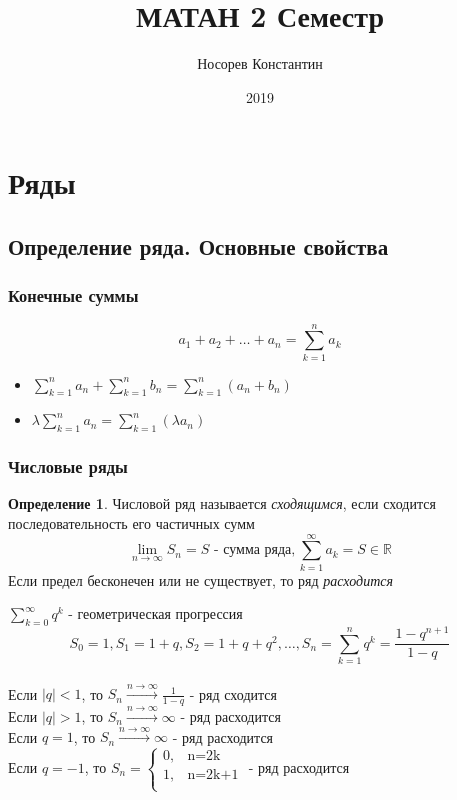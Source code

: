 \documentclass[a4paper]{article}
\title{ МАТАН 2 Семестр}
\author{Носорев Константин}
\date{2019\\}
\theoremstyle{definition}
\newtheorem{definition}{Определение}
\numberwithin{theorem}{subsection}
\numberwithin{lemma}{subsection}
\numberwithin{definition}{subsection}
\numberwithin{comment*}{subsection}
\numberwithin{consequence}{subsection}
\numberwithin{property}{subsection}
\begin{document}
\maketitle
\tableofcontents
\section{Ряды}
\subsection{Определение ряда. Основные свойства}
\setcounter{subsubsection}{-1}

\subsubsection{Конечные суммы}
$$a_1+a_2+\dots+a_n = \sum_{k=1}^{n} a_k$$
\begin{itemize}
 \item $\sum_{k=1}^{n}{a_n} + \sum_{k=1}^{n}{b_n} = \sum_{k=1}^{n}{(a_n+b_n)}$
 \item $\lambda \sum_{k=1}^{n}{a_n} = \sum_{k=1}^{n}{(\lambda a_n)}$
\end{itemize}
\subsubsection{Числовые ряды}
\begin{definition}
 Числовой ряд называется \textit{сходящимся}, если сходится последовательность его частичных сумм\\
 $$\lim_{n\rightarrow \infty}{S_n}=S \text{ - сумма ряда}, \sum_{k=1}^{\infty}{a_k} = S \in \mathbb{R} $$
 Если предел бесконечен или не существует, то ряд \textit{расходится}
\end{definition}
\exmp $\sum_{k=0}^{\infty}{q^k} \text{ - геометрическая прогрессия }$\\
$$S_0 = 1, S_1 = 1+q, S_2= 1 + q +q^2, \dots , S_n = \sum_{k=1}^{n}{q^k} = \frac{1-q^{n+1}}{1-q}$$\\
Если $|q| < 1$, то $S_n \xrightarrow{n\rightarrow \infty} \frac{1}{1-q}$ - ряд сходится\\
Если $|q| > 1$, то $S_n \xrightarrow{n\rightarrow \infty} \infty$ - ряд расходится\\
Если $q = 1$, то $S_n \xrightarrow{n\rightarrow \infty} \infty$ - ряд расходится\\
Если $q = -1$, то $S_n = \begin{cases}
  0, & \text{n=2k}   \\
  1, & \text{n=2k+1} \\
 \end{cases}$ - ряд расходится\\
\end{document}
